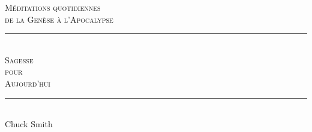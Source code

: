
\newcommand{\HRule}{\rule{\linewidth}{0.2mm}}

\begin{titlepage}
\begin{center}
\mbox{}
\vfill
\textsc{\large Méditations quotidiennes\\de la Genèse à l'Apocalypse}
\\[1.5cm]
\HRule \\[0.4cm]
\textsc{ \Huge Sagesse\\ pour\\[0.4cm] Aujourd'hui}\\[0.4cm]

\HRule \\[1.5cm]
{\LARGE Chuck Smith}\\[1.5cm]
\vfill
\mbox{}
\end{center}
\end{titlepage}

